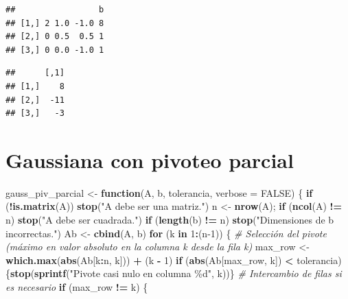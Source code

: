 \documentclass[
]{book}
\newenvironment{Shaded}{\begin{snugshade}}{\end{snugshade}}
\newcommand{\AttributeTok}[1]{\textcolor[rgb]{0.13,0.29,0.53}{#1}}
\newcommand{\CommentTok}[1]{\textcolor[rgb]{0.56,0.35,0.01}{\textit{#1}}}
\newcommand{\ConstantTok}[1]{\textcolor[rgb]{0.56,0.35,0.01}{#1}}
\newcommand{\ControlFlowTok}[1]{\textcolor[rgb]{0.13,0.29,0.53}{\textbf{#1}}}
\newcommand{\DecValTok}[1]{\textcolor[rgb]{0.00,0.00,0.81}{#1}}
\newcommand{\FunctionTok}[1]{\textcolor[rgb]{0.13,0.29,0.53}{\textbf{#1}}}
\newcommand{\NormalTok}[1]{#1}
\newcommand{\OtherTok}[1]{\textcolor[rgb]{0.56,0.35,0.01}{#1}}
\newcommand{\SpecialCharTok}[1]{\textcolor[rgb]{0.81,0.36,0.00}{\textbf{#1}}}
\newcommand{\StringTok}[1]{\textcolor[rgb]{0.31,0.60,0.02}{#1}}
\begin{document}
\begin{verbatim}
##                 b
## [1,] 2 1.0 -1.0 8
## [2,] 0 0.5  0.5 1
## [3,] 0 0.0 -1.0 1
\end{verbatim}

\begin{verbatim}
##      [,1]
## [1,]    8
## [2,]  -11
## [3,]   -3
\end{verbatim}

\section{Gaussiana con pivoteo
parcial}\label{gaussiana-con-pivoteo-parcial}

\begin{Shaded}
\begin{Highlighting}[]
\NormalTok{gauss\_piv\_parcial }\OtherTok{\textless{}{-}} \ControlFlowTok{function}\NormalTok{(A, b, tolerancia, }\AttributeTok{verbose =} \ConstantTok{FALSE}\NormalTok{) \{}
  \ControlFlowTok{if}\NormalTok{ (}\SpecialCharTok{!}\FunctionTok{is.matrix}\NormalTok{(A)) }\FunctionTok{stop}\NormalTok{(}\StringTok{"A debe ser una matriz."}\NormalTok{)}
\NormalTok{  n }\OtherTok{\textless{}{-}} \FunctionTok{nrow}\NormalTok{(A); }\ControlFlowTok{if}\NormalTok{ (}\FunctionTok{ncol}\NormalTok{(A) }\SpecialCharTok{!=}\NormalTok{ n) }\FunctionTok{stop}\NormalTok{(}\StringTok{"A debe ser cuadrada."}\NormalTok{)}
  \ControlFlowTok{if}\NormalTok{ (}\FunctionTok{length}\NormalTok{(b) }\SpecialCharTok{!=}\NormalTok{ n) }\FunctionTok{stop}\NormalTok{(}\StringTok{"Dimensiones de b incorrectas."}\NormalTok{)}
\NormalTok{  Ab }\OtherTok{\textless{}{-}} \FunctionTok{cbind}\NormalTok{(A, b)}
  \ControlFlowTok{for}\NormalTok{ (k }\ControlFlowTok{in} \DecValTok{1}\SpecialCharTok{:}\NormalTok{(n}\DecValTok{{-}1}\NormalTok{)) \{}
    \CommentTok{\# Selección del pivote (máximo en valor absoluto en la columna k desde la fila k)}
\NormalTok{    max\_row }\OtherTok{\textless{}{-}} \FunctionTok{which.max}\NormalTok{(}\FunctionTok{abs}\NormalTok{(Ab[k}\SpecialCharTok{:}\NormalTok{n, k])) }\SpecialCharTok{+}\NormalTok{ (k }\SpecialCharTok{{-}} \DecValTok{1}\NormalTok{)}
    \ControlFlowTok{if}\NormalTok{ (}\FunctionTok{abs}\NormalTok{(Ab[max\_row, k]) }\SpecialCharTok{\textless{}}\NormalTok{ tolerancia)\{}\FunctionTok{stop}\NormalTok{(}\FunctionTok{sprintf}\NormalTok{(}\StringTok{"Pivote casi nulo en columna \%d"}\NormalTok{, k))\}}
    \CommentTok{\# Intercambio de filas si es necesario}
    \ControlFlowTok{if}\NormalTok{ (max\_row }\SpecialCharTok{!=}\NormalTok{ k) \{}

\end{Highlighting}
\end{Shaded}
\end{document}
